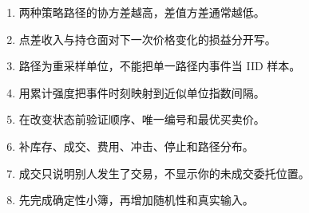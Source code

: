 \begin{enumerate}[leftmargin=*]
  \item 两种策略路径的协方差越高，差值方差通常越低。
  \item 点差收入与持仓面对下一次价格变化的损益分开写。
  \item 路径为重采样单位，不能把单一路径内事件当 IID 样本。
  \item 用累计强度把事件时刻映射到近似单位指数间隔。
  \item 在改变状态前验证顺序、唯一编号和最优买卖价。
  \item 补库存、成交、费用、冲击、停止和路径分布。
  \item 成交只说明别人发生了交易，不显示你的未成交委托位置。
  \item 先完成确定性小簿，再增加随机性和真实输入。
\end{enumerate}
